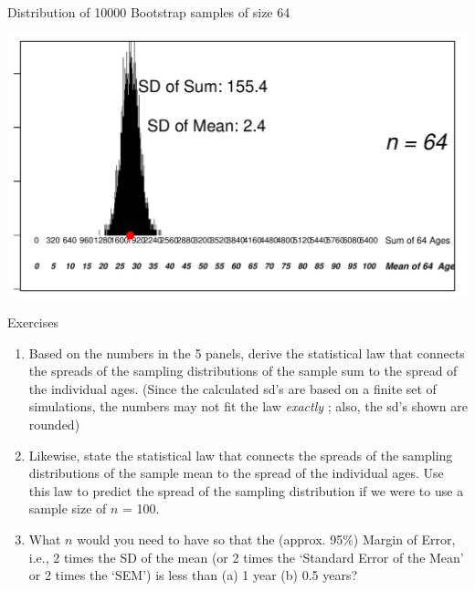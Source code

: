 \documentclass[10pt,handout]{beamer}\usepackage[]{graphicx}\usepackage[]{color}
\makeatletter
\def\maxwidth{ %
  \ifdim\Gin@nat@width>\linewidth
    \linewidth
  \else
    \Gin@nat@width
  \fi
}
\newenvironment{knitrout}{}{} %
\makeatother
\begin{document}
\begin{frame}[fragile]{Distribution of 10000 Bootstrap samples of size 64}
\begin{knitrout}\tiny
{}\color{fgcolor}

{\centering \includegraphics[width=\maxwidth]{figure/unnamed-chunk-6-1} 

}



\end{knitrout}
	
\end{frame}



\begin{frame}{Exercises}

	\begin{enumerate}
		\def\labelenumi{\arabic{enumi}.}
		\item
		Based on the numbers in the 5 panels, derive the statistical law that
		connects the spreads of the sampling distributions of the sample sum
		to the spread of the individual ages. (Since the calculated sd's are
		based on a finite set of simulations, the numbers may not fit the law
		\emph{exactly} ; also, the sd's shown are rounded)
		\item
		Likewise, state the statistical law that connects the spreads of the
		sampling distributions of the sample mean to the spread of the
		individual ages. Use this law to predict the spread of the sampling
		distribution if we were to use a sample size of \(n\) = 100.
		\item
		What \(n\) would you need to have so that the (approx. 95\%) Margin of
		Error, i.e., 2 times the SD of the mean (or 2 times the `Standard
		Error of the Mean' or 2 times the `SEM') is less than (a) 1 year (b)
		0.5 years?
	\end{enumerate}
\end{frame}
\end{document}
